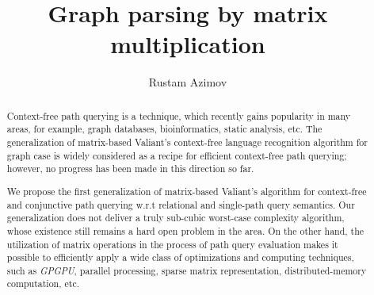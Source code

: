 \title{Graph parsing by matrix multiplication}


\author{Rustam Azimov}



\graphicspath{{Azimov/}}

\newtheorem{mytheorem}{Theorem}
\newtheorem{mydef}{Definition}


\maketitle

\begin{abstract}
Context-free path querying is a technique, which recently gains popularity in many areas, for example, graph databases, bioinformatics, static analysis, etc. The generalization of matrix-based Valiant's context-free language recognition algorithm for graph case is widely considered as a recipe for efficient context-free path querying; however, no progress has been made in this direction so far.

We propose the first generalization of matrix-based Valiant's algorithm for context-free and conjunctive path querying w.r.t relational and single-path query semantics. Our generalization does not deliver a truly sub-cubic worst-case complexity algorithm, whose existence still remains a hard open problem in the area. On the other hand, the utilization of matrix operations in the process of path query evaluation makes it possible to efficiently apply a wide class of optimizations and computing techniques, such as \textit{GPGPU}, parallel processing, sparse matrix representation, distributed-memory computation, etc.

\end{abstract}











  
  

